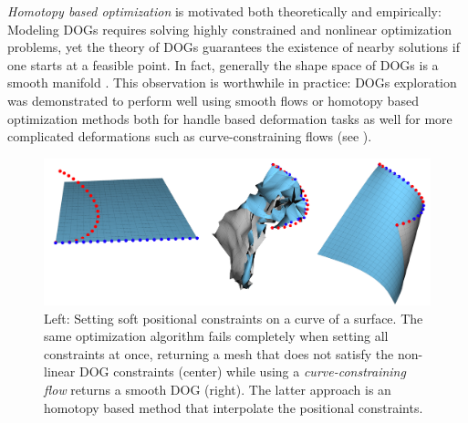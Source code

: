 \emph{Homotopy based optimization} is motivated both theoretically and empirically: Modeling DOGs requires solving highly constrained and nonlinear optimization problems, yet the theory of DOGs guarantees the existence of nearby solutions if one starts at a feasible point. In fact, generally the shape space of DOGs is a smooth manifold \cite{rabi2018shape}. This observation is worthwhile  in practice: DOGs exploration was demonstrated to perform well using smooth flows or homotopy based optimization methods both for handle based deformation tasks as well for more complicated deformations such as curve-constraining flows \cite{rabi2018shape} (see ).
\begin{figure} [h]
	\centering
	\includegraphics[width=0.8\linewidth]{figures/homotopy_curve}
	\caption{Left: Setting soft positional constraints on a curve of a surface. The same optimization algorithm fails completely when setting all constraints at once, returning a mesh that does not satisfy the non-linear DOG constraints (center) while using a \textit{curve-constraining flow} \cite{rabi2018shape} returns a smooth DOG (right). The latter approach is an homotopy based method that interpolate the positional constraints.} 
	\label{fig:homotopy_curve}
\end{figure}

